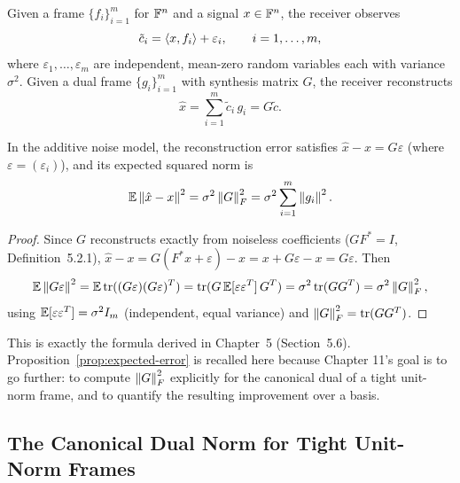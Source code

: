 \begin{definition}
\label{def:noise-model}
Given a frame $\{f_i\}_{i=1}^m$ for $\mathbb{F}^n$ and a signal $x\in\mathbb{F}^n$,
the receiver observes
\[
  \tilde c_i = \left\langle x, f_i \right\rangle + \varepsilon_i, \qquad i=1,\ldots,m,
\]
where $\varepsilon_1,\ldots,\varepsilon_m$ are independent, mean-zero
random variables each with variance $\sigma^2$. Given a dual frame
$\{g_i\}_{i=1}^m$ with synthesis matrix $G$, the receiver reconstructs
\[
  \hat x = \sum_{i=1}^m \tilde c_i\, g_i = G\tilde c.
\]
\end{definition}

\begin{proposition}
\label{prop:expected-error}
In the additive noise model, the reconstruction error satisfies
$\hat x - x = G\varepsilon$ (where $\varepsilon=(\varepsilon_i)$),
and its expected squared norm is
\begin{equation}
\label{eq:expected-error}
  \mathbb{E}\left\| \hat x - x \right\|^2 = \sigma^2 \left\| G \right\|_F^2
  = \sigma^2 \sum_{i=1}^m \left\| g_i \right\|^2.
\end{equation}
\end{proposition}

\begin{proof}
Since $G$ reconstructs exactly from noiseless coefficients ($GF^*=I$,
Definition~5.2.1), $\hat x - x = G(F^*x+\varepsilon) - x = x + G\varepsilon
- x = G\varepsilon$. Then
\[
  \mathbb{E}\left\| G\varepsilon \right\|^2 = \mathbb{E}\operatorname{tr}((G\varepsilon)(G\varepsilon)^T)
  = \operatorname{tr}(G\,\mathbb{E}[\varepsilon\varepsilon^T]\,G^T)
  = \sigma^2\operatorname{tr}(GG^T)
  = \sigma^2\left\| G \right\|_F^2,
\]
using $\mathbb{E}[\varepsilon\varepsilon^T]=\sigma^2 I_m$ (independent, equal
variance) and $\left\| G \right\|_F^2=\operatorname{tr}(GG^T)$.
\end{proof}

\begin{remark*}
This is exactly the formula derived in Chapter~5 (Section~5.6).
Proposition~\ref{prop:expected-error} is recalled here because Chapter
11's goal is to go further: to compute $\left\| G \right\|_F^2$ explicitly for
the canonical dual of a tight unit-norm frame, and to quantify the
resulting improvement over a basis.
\end{remark*}

\subsection{The Canonical Dual Norm for Tight Unit-Norm Frames}
\label{subsec:canonical-dual-norm}

